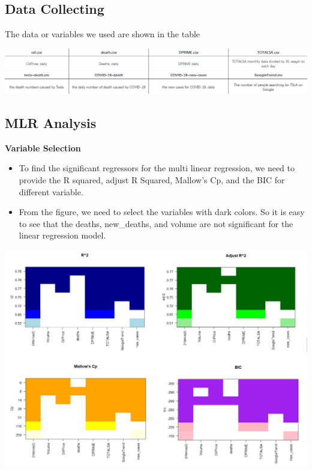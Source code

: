 \documentclass[a0,portrait]{a0poster}
\begin{document}
\begin{multicols}{3}
\section*{Data Collecting}
The data or variables we used are shown in the table 
\begin{center}
\includegraphics[width=22cm]{vara.png}
\end{center}



\subsection*{MLR Analysis}
\textbf{Variable Selection}
\begin{itemize}
\item To find the significant regressors for the multi linear regression, we need to provide the R squared, adjust R Squared, Mallow's Cp, and the BIC for different variable.
\item From the figure, we need to select the variables with dark colors. So it is easy to see that the deaths, new\_deaths, and volume 
are not significant for the linear regression model.
\end{itemize}
\begin{center}\vspace{1cm}
\includegraphics[width=1.0\linewidth]{comb.png}
\end{center}


\end{multicols}
\end{document}
